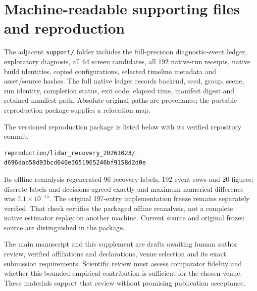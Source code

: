 \documentclass[conference,onecolumn]{IEEEtran}
\begin{document}
\section{Machine-readable supporting files and reproduction}
The adjacent \texttt{support/} folder includes the full-precision diagnostic-event
ledger, exploratory diagnosis, all 64 screen candidates, all 192 native-run
receipts, native build identities, copied configurations, selected timeline
metadata and asset/source hashes. The full native ledger records backend,
seed, group, scene, run identity, completion status, exit code, elapsed time,
manifest digest and retained manifest path. Absolute original paths are provenance;
the portable reproduction package supplies a relocation map.

The versioned reproduction package is listed below with its verified repository commit.
\begin{lstlisting}
reproduction/lidar_recovery_20261023/
d696dab58d93bcd640e3651965246bf9158d2d0e
\end{lstlisting}
Its offline reanalysis regenerated 96 recovery labels, 192 event rows and
20 figures; discrete labels and decisions agreed exactly and maximum numerical
difference was $7.1\times10^{-15}$. The original 197-entry implementation freeze
remains separately verified. That check certifies the packaged offline reanalysis,
not a complete native estimator replay on another machine. Current source and
original frozen source are distinguished in the package.

The main manuscript and this supplement are drafts awaiting human author review,
verified affiliations and declarations, venue selection and its exact submission
requirements. Scientific review must assess comparator fidelity and whether this
bounded empirical contribution is sufficient for the chosen venue. These
materials support that review without promising publication acceptance.
\end{document}
